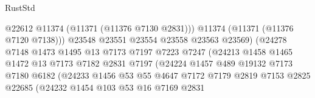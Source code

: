 \begin{lexlean}{RustStd}
\begin{coremodule}
                                          @22612
                                          @11374
                                          (@11371 (@11376 @7130 @2831)))
                                        @11374
                                        (@11371 (@11376 @7120 @7138)))
                                      @23548
                                      @23551
                                      @23554
                                      @23558
                                      @23563
                                      @23569)
                                    (@24278
                                      @7148
                                      @1473
                                      @1495
                                      @13
                                      @7173
                                      @7197
                                      @7223
                                      @7247
                                      (@24213
                                        @1458
                                        @1465
                                        @1472
                                        @13
                                        @7173
                                        @7182
                                        @2831
                                        @7197
                                        (@24224
                                          @1457
                                          @489
                                          @19132
                                          @7173
                                          @7180
                                          @6182
                                          (@24233
                                            @1456
                                            @53
                                            @55
                                            @4647
                                            @7172
                                            @7179
                                            @2819
                                            @7153
                                            @2825
                                            @22685
                                            (@24232
                                              @1454
                                              @103
                                              @53
                                              @16
                                              @7169
                                              @2831

\end{coremodule}
\end{lexlean}
